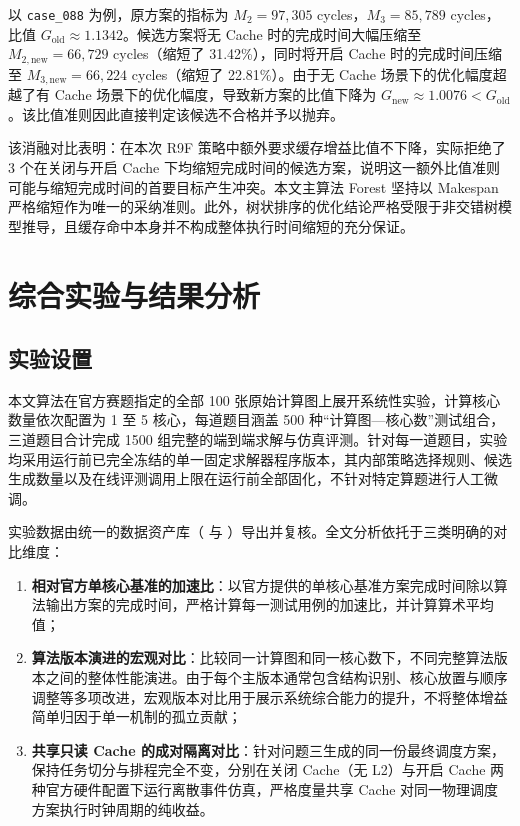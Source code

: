 \documentclass[anonymous,withtoc]{gmcm2026}
\providecommand{\tightlist}{\setlength{\itemsep}{0pt}\setlength{\parskip}{0pt}}
\begin{document}
以 \texttt{case\_088} 为例，原方案的指标为 \(M_2 = 97{,}305\) cycles，\(M_3 = 85{,}789\) cycles，比值 \(G_{\mathrm{old}} \approx 1.1342\)。候选方案将无 Cache 时的完成时间大幅压缩至 \(M_{2, \mathrm{new}} = 66{,}729\) cycles（缩短了 31.42\%），同时将开启 Cache 时的完成时间压缩至 \(M_{3, \mathrm{new}} = 66{,}224\) cycles（缩短了 22.81\%）。由于无 Cache 场景下的优化幅度超越了有 Cache 场景下的优化幅度，导致新方案的比值下降为 \(G_{\mathrm{new}} \approx 1.0076 < G_{\mathrm{old}}\)。该比值准则因此直接判定该候选不合格并予以抛弃。

该消融对比表明：在本次 R9F 策略中额外要求缓存增益比值不下降，实际拒绝了 3 个在关闭与开启 Cache 下均缩短完成时间的候选方案，说明这一额外比值准则可能与缩短完成时间的首要目标产生冲突。本文主算法 Forest 坚持以 Makespan 严格缩短作为唯一的采纳准则。此外，树状排序的优化结论严格受限于非交错树模型推导，且缓存命中本身并不构成整体执行时间缩短的充分保证。


\section{综合实验与结果分析}

\subsection{实验设置}

本文算法在官方赛题指定的全部 100 张原始计算图上展开系统性实验，计算核心数量依次配置为 1 至 5 核心，每道题目涵盖 500 种``计算图---核心数''测试组合，三道题目合计完成 1500 组完整的端到端求解与仿真评测。针对每一道题目，实验均采用运行前已完全冻结的单一固定求解器程序版本，其内部策略选择规则、候选生成数量以及在线评测调用上限在运行前全部固化，不针对特定算题进行人工微调。

实验数据由统一的数据资产库（\texttt{} 与 \texttt{}）导出并复核。全文分析依托于三类明确的对比维度：

\begin{enumerate}
\def\labelenumi{\arabic{enumi}.}
\tightlist
\item
  \textbf{相对官方单核心基准的加速比}：以官方提供的单核心基准方案完成时间除以算法输出方案的完成时间，严格计算每一测试用例的加速比，并计算算术平均值；
\item
  \textbf{算法版本演进的宏观对比}：比较同一计算图和同一核心数下，不同完整算法版本之间的整体性能演进。由于每个主版本通常包含结构识别、核心放置与顺序调整等多项改进，宏观版本对比用于展示系统综合能力的提升，不将整体增益简单归因于单一机制的孤立贡献；
\item
  \textbf{共享只读 Cache 的成对隔离对比}：针对问题三生成的同一份最终调度方案，保持任务切分与排程完全不变，分别在关闭 Cache（无 L2）与开启 Cache 两种官方硬件配置下运行离散事件仿真，严格度量共享 Cache 对同一物理调度方案执行时钟周期的纯收益。
\end{enumerate}
\end{document}
